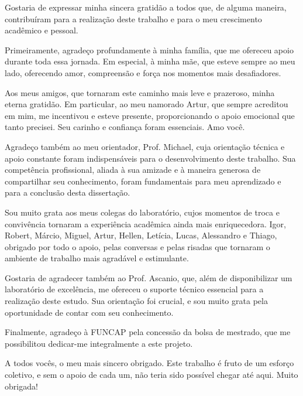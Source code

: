 Gostaria de expressar minha sincera gratidão a todos que, de alguma maneira, contribuíram para a realização deste trabalho e para o meu crescimento acadêmico e pessoal.

Primeiramente, agradeço profundamente à minha família, que me ofereceu apoio durante toda essa jornada. Em especial, à minha mãe, que esteve sempre ao meu lado, oferecendo amor, compreensão e força nos momentos mais desafiadores.

Aos meus amigos, que tornaram este caminho mais leve e prazeroso, minha eterna gratidão. Em particular, ao meu namorado Artur, que sempre acreditou em mim, me incentivou e esteve presente, proporcionando o apoio emocional que tanto precisei. Seu carinho e confiança foram essenciais. Amo você.

Agradeço também ao meu orientador, Prof. Michael, cuja orientação técnica e apoio constante foram indispensáveis para o desenvolvimento deste trabalho. Sua competência profissional, aliada à sua amizade e à maneira generosa de compartilhar seu conhecimento, foram fundamentais para meu aprendizado e para a conclusão desta dissertação.

Sou muito grata aos meus colegas do laboratório, cujos momentos de troca e convivência tornaram a experiência acadêmica ainda mais enriquecedora. Igor, Robert, Márcio, Miguel, Artur, Hellen, Letícia, Lucas, Alessandro e Thiago, obrigado por todo o apoio, pelas conversas e pelas risadas que tornaram o ambiente de trabalho mais agradável e estimulante.

Gostaria de agradecer também ao Prof. Ascanio, que, além de disponibilizar um laboratório de excelência, me ofereceu o suporte técnico essencial para a realização deste estudo. Sua orientação foi crucial, e sou muito grata pela oportunidade de contar com seu conhecimento.

Finalmente, agradeço à FUNCAP pela concessão da bolsa de mestrado, que me possibilitou dedicar-me integralmente a este projeto.

A todos vocês, o meu mais sincero obrigado. Este trabalho é fruto de um esforço coletivo, e sem o apoio de cada um, não teria sido possível chegar até aqui. Muito obrigada!